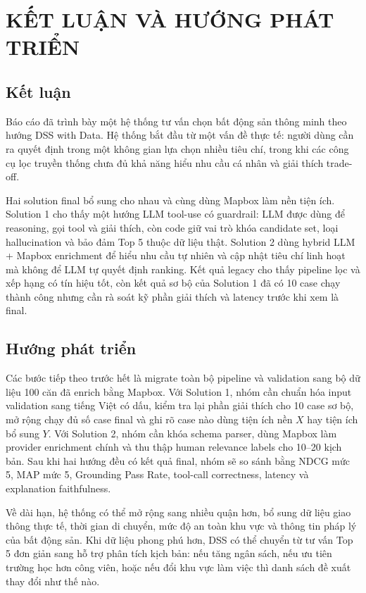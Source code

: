\documentclass[a4paper,12pt]{article}
\begin{document}
\section{KẾT LUẬN VÀ HƯỚNG PHÁT TRIỂN}

\subsection{Kết luận}
Báo cáo đã trình bày một hệ thống tư vấn chọn bất động sản thông minh theo hướng DSS with Data. Hệ thống bắt đầu từ một vấn đề thực tế: người dùng cần ra quyết định trong một không gian lựa chọn nhiều tiêu chí, trong khi các công cụ lọc truyền thống chưa đủ khả năng hiểu nhu cầu cá nhân và giải thích trade-off.

Hai solution final bổ sung cho nhau và cùng dùng Mapbox làm nền tiện ích. Solution 1 cho thấy một hướng LLM tool-use có guardrail: LLM được dùng để reasoning, gọi tool và giải thích, còn code giữ vai trò khóa candidate set, loại hallucination và bảo đảm Top 5 thuộc dữ liệu thật. Solution 2 dùng hybrid LLM + Mapbox enrichment để hiểu nhu cầu tự nhiên và cập nhật tiêu chí linh hoạt mà không để LLM tự quyết định ranking. Kết quả legacy cho thấy pipeline lọc và xếp hạng có tín hiệu tốt, còn kết quả sơ bộ của Solution 1 đã có 10 case chạy thành công nhưng cần rà soát kỹ phần giải thích và latency trước khi xem là final.

\subsection{Hướng phát triển}
Các bước tiếp theo trước hết là migrate toàn bộ pipeline và validation sang bộ dữ liệu 100 căn đã enrich bằng Mapbox. Với Solution 1, nhóm cần chuẩn hóa input validation sang tiếng Việt có dấu, kiểm tra lại phần giải thích cho 10 case sơ bộ, mở rộng chạy đủ số case final và ghi rõ case nào dùng tiện ích nền $X$ hay tiện ích bổ sung $Y$. Với Solution 2, nhóm cần khóa schema parser, dùng Mapbox làm provider enrichment chính và thu thập human relevance labels cho 10--20 kịch bản. Sau khi hai hướng đều có kết quả final, nhóm sẽ so sánh bằng NDCG mức 5, MAP mức 5, Grounding Pass Rate, tool-call correctness, latency và explanation faithfulness.

Về dài hạn, hệ thống có thể mở rộng sang nhiều quận hơn, bổ sung dữ liệu giao thông thực tế, thời gian di chuyển, mức độ an toàn khu vực và thông tin pháp lý của bất động sản. Khi dữ liệu phong phú hơn, DSS có thể chuyển từ tư vấn Top 5 đơn giản sang hỗ trợ phân tích kịch bản: nếu tăng ngân sách, nếu ưu tiên trường học hơn công viên, hoặc nếu đổi khu vực làm việc thì danh sách đề xuất thay đổi như thế nào.

\printbibliography[heading=bibintoc,title={Tài liệu tham khảo}]
\end{document}

